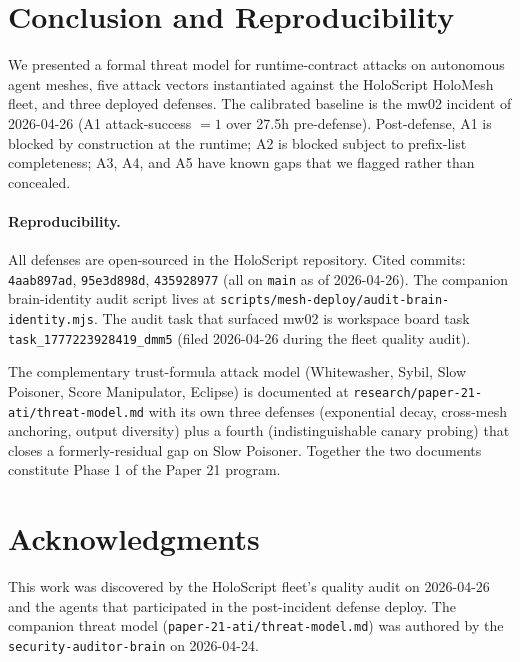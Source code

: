 \documentclass[letterpaper,twocolumn,10pt]{article}
\newcommand{\holoscript}{HoloScript}
\newcommand{\holomesh}{HoloMesh}
\begin{document}
\section{Conclusion and Reproducibility}
\label{sec:conclusion}

We presented a formal threat model for runtime-contract attacks on
autonomous agent meshes, five attack vectors instantiated against
the \holoscript{} \holomesh{} fleet, and three deployed defenses.
The calibrated baseline is the mw02 incident of 2026-04-26 (A1
attack-success $= 1$ over 27.5h pre-defense). Post-defense, A1 is
blocked by construction at the runtime; A2 is blocked subject to
prefix-list completeness; A3, A4, and A5 have known gaps that we
flagged rather than concealed.

\paragraph{Reproducibility.} All defenses are open-sourced in the
\holoscript{} repository.
Cited commits: \texttt{4aab897ad}, \texttt{95e3d898d},
\texttt{435928977} (all on \texttt{main} as of 2026-04-26).
The companion brain-identity audit script lives at
\texttt{scripts/mesh-deploy/audit-brain-identity.mjs}. The audit task
that surfaced mw02 is workspace board task
\texttt{task\_1777223928419\_dmm5} (filed 2026-04-26 during the
fleet quality audit).

The complementary trust-formula attack model (Whitewasher, Sybil,
Slow Poisoner, Score Manipulator, Eclipse) is documented at
\texttt{research/paper-21-ati/threat-model.md} with its own three
defenses (exponential decay, cross-mesh anchoring, output diversity)
plus a fourth (indistinguishable canary probing) that closes a
formerly-residual gap on Slow Poisoner. Together the two documents
constitute Phase 1 of the Paper 21 program.

\section*{Acknowledgments}

This work was discovered by the \holoscript{} fleet's quality audit
on 2026-04-26 and the agents that participated in the post-incident
defense deploy. The companion threat model
(\texttt{paper-21-ati/threat-model.md}) was authored by the
\texttt{security-auditor-brain} on 2026-04-24.
\end{document}

